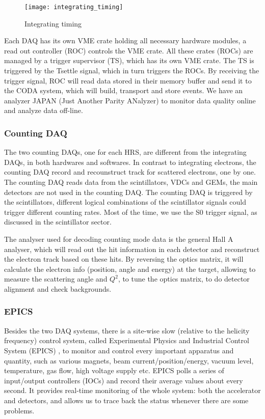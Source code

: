 \begin{figure}
    \centering
    \texttt{[image: integrating\_timing]}
    \caption{Integrating timing}
    \label{fig:integrating_timing}
\end{figure}

Each DAQ has its own VME crate holding all necessary hardware modules, a read 
out controller (ROC) controls the VME crate. All these crates (ROCs) are
managed by a trigger supervisor (TS), which has its own VME crate. The TS is
triggered by the Tsettle signal, which in turn triggers the ROCs.
By receiving the trigger signal, ROC will read data stored in their memory 
buffer and send it to the CODA system, 
which will build, transport and store events. We have an analyzer JAPAN (Just
Another Parity ANalyzer) to monitor data quality online and analyze data off-line.


\subsubsection{Counting DAQ}
The two counting DAQs, one for each HRS, are different from the integrating DAQs,
in both hardwares and softwares. In contrast to integrating electrons,
the counting DAQ record and recounstruct track for scattered electrons, one by one.
The counting DAQ reads data from the scintillators, VDCs and GEMs, 
the main detectors are not used in the counting DAQ. The counting DAQ is
triggered by the scintillators, different logical combinations of the scintillator
signals could trigger different counting rates. Most of the time, we use the S0
trigger signal, as discussed in the scintillator sector.

The analyser used for decoding counting mode data is the general Hall A analyser,
which will read out the hit information in each detector and reconstruct the 
electron track based on these hits. By reversing the optics matrix, it will
calculate the electron info (position, angle and energy) at the target, allowing
to measure the scattering angle and $Q^2$, to tune the optics matrix, 
to do detector alignment and check backgrounds.

\subsubsection{EPICS}
Besides the two DAQ systems, there is a site-wise slow (relative to the helicity frequency) 
control system, called Experimental Physics and Industrial Control System (EPICS) \cite{EPICS},
to monitor and control every important apparatus and quantity, such as various magnets, 
beam current/position/energy, vacuum level, temperature, gas flow, 
high voltage supply etc. EPICS polls a series of 
input/output controllers (IOCs) and record their average values about every second.
It provides real-time monitoring of the whole system: both the accelerator and detectors, and
allows us to trace back the status whenever there are some problems.
